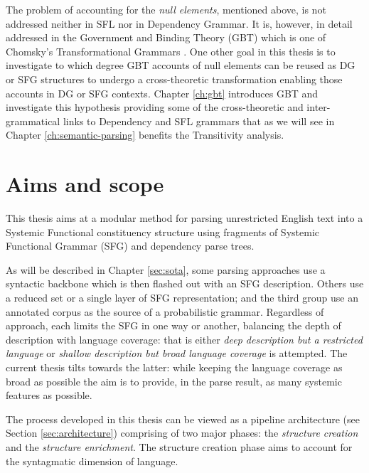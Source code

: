 The problem of accounting for the \textit{null elements}, mentioned above, is not addressed neither in SFL nor in Dependency Grammar. It is, however, in detail addressed in the Government and Binding Theory (GBT) \citep{Chomsky81,Haegeman1991} which is one of Chomsky's Transformational Grammars \citep{Chomsky1957}. One other goal in this thesis is to investigate to which degree GBT accounts of null elements can be reused as DG or SFG structures to undergo a cross-theoretic transformation enabling those accounts in DG or SFG contexts. Chapter \ref{ch:gbt} introduces GBT and investigate this hypothesis providing some of the cross-theoretic and inter-grammatical links to Dependency and SFL grammars that as we will see in Chapter \ref{ch:semantic-parsing} benefits the Transitivity analysis.


\section{Aims and scope}
\label{sec:solution}

This thesis aims at a modular method for parsing unrestricted English text into a Systemic Functional constituency structure using fragments of Systemic Functional Grammar (SFG) and dependency parse trees.

As will be described in Chapter \ref{sec:sota}, some parsing approaches use a syntactic backbone which is then flashed out with an SFG description. Others use a reduced set or a single layer of SFG representation; and the third group use an annotated corpus as the source of a probabilistic grammar. Regardless of approach, each limits the SFG in one way or another, balancing the depth of description with language coverage: that is either \textit{deep description but a restricted language} or \textit{shallow description but broad language coverage} is attempted. The current thesis tilts towards the latter: while keeping the language coverage as broad as possible the aim is to provide, in the parse result, as many systemic features as possible.

The process developed in this thesis can be viewed as a pipeline architecture (see Section \ref{sec:architecture}) comprising of two major phases: the \textit{structure creation} and the \textit{structure enrichment}. The structure creation phase aims to account for the syntagmatic dimension of language. 

